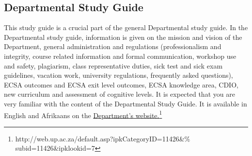     \subsection{Departmental Study Guide}
        This study guide is a crucial part of the general Departmental study guide.
        In the Departmental study guide, information is given
        on the mission and vision of the Department, general administration and
        regulations (professionalism and integrity, course related information
        and formal communication, workshop use and safety, plagiarism, class
        representative duties, sick test and sick exam guidelines, vacation
        work, university regulations, frequently asked questions), ECSA
        outcomes and ECSA exit level outcomes, ECSA knowledge area, CDIO,
        new curriculum and assessment of cognitive levels. It is expected that
        you are very familiar with the content of the Departmental Study Guide.
        It is available in English and Afrikaans on the
        \href{http://web.up.ac.za/default.asp?ipkCategoryID=11426&subid=11426&%
              ipklookid=7}{Department’s website.\footnote{%
              \url{http://web.up.ac.za/default.asp?ipkCategoryID=11426&%
                   subid=11426&ipklookid=7}}}
                   